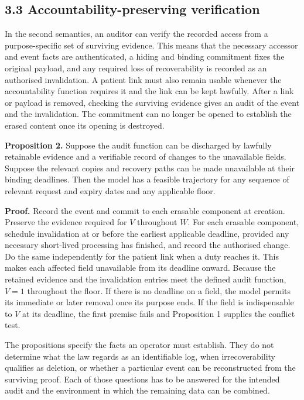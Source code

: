 \documentclass[5p,twocolumn]{elsarticle}
\begin{document}
\hypertarget{accountability-preserving-verification}{%
\subsection{3.3 Accountability-preserving
verification}\label{accountability-preserving-verification}}

In the second semantics, an auditor can verify the recorded access from
a purpose-specific set of surviving evidence. This means that the
necessary accessor and event facts are authenticated, a hiding and
binding commitment fixes the original payload, and any required loss of
recoverability is recorded as an authorised invalidation. A patient link
must also remain usable whenever the accountability function requires it
and the link can be kept lawfully. After a link or payload is removed,
checking the surviving evidence gives an audit of the event and the
invalidation. The commitment can no longer be opened to establish the
erased content once its opening is destroyed.

\textbf{Proposition 2.} Suppose the audit function can be discharged by
lawfully retainable evidence and a verifiable record of changes to the
unavailable fields. Suppose the relevant copies and recovery paths can
be made unavailable at their binding deadlines. Then the model has a
feasible trajectory for any sequence of relevant request and expiry
dates and any applicable floor.

\textbf{Proof.} Record the event and commit to each erasable component
at creation. Preserve the evidence required for \(V\) throughout \(W\).
For each erasable component, schedule invalidation at or before the
earliest applicable deadline, provided any necessary short-lived
processing has finished, and record the authorised change. Do the same
independently for the patient link when a duty reaches it. This makes
each affected field unavailable from its deadline onward. Because the
retained evidence and the invalidation entries meet the defined audit
function, \(V = 1\) throughout the floor. If there is no deadline on a
field, the model permits its immediate or later removal once its purpose
ends. If the field is indispensable to \(V\) at its deadline, the first
premise fails and Proposition 1 supplies the conflict test.

The propositions specify the facts an operator must establish. They do
not determine what the law regards as an identifiable log, when
irrecoverability qualifies as deletion, or whether a particular event
can be reconstructed from the surviving proof. Each of those questions
has to be answered for the intended audit and the environment in which
the remaining data can be combined.
\end{document}
